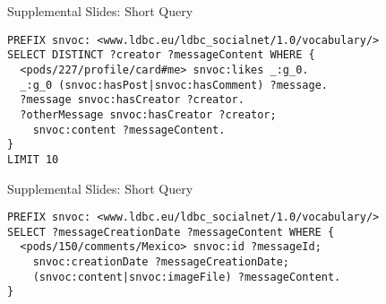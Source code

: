 

\begin{frame}[fragile]{Supplemental Slides: Short Query}
\begin{lstlisting}[captionpos=b, label=lst:sparql,
   basicstyle=\ttfamily,frame=single]
PREFIX snvoc: <www.ldbc.eu/ldbc_socialnet/1.0/vocabulary/>
SELECT DISTINCT ?creator ?messageContent WHERE {
  <pods/227/profile/card#me> snvoc:likes _:g_0.
  _:g_0 (snvoc:hasPost|snvoc:hasComment) ?message.
  ?message snvoc:hasCreator ?creator.
  ?otherMessage snvoc:hasCreator ?creator;
    snvoc:content ?messageContent.
}
LIMIT 10
\end{lstlisting}
\end{frame}

\begin{frame}[fragile]{Supplemental Slides: Short Query}
\begin{lstlisting}[captionpos=b, label=lst:sparql,
   basicstyle=\ttfamily,frame=single]
PREFIX snvoc: <www.ldbc.eu/ldbc_socialnet/1.0/vocabulary/>
SELECT ?messageCreationDate ?messageContent WHERE {
  <pods/150/comments/Mexico> snvoc:id ?messageId;
    snvoc:creationDate ?messageCreationDate;
    (snvoc:content|snvoc:imageFile) ?messageContent.
}
\end{lstlisting}
\end{frame}